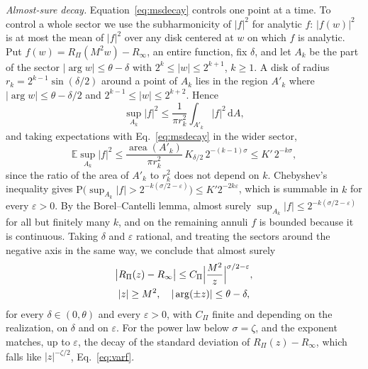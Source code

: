 \documentclass[aps,prd,10pt,twocolumn,superscriptaddress,nofootinbib,floatfix,longbibliography]{revtex4-2}
\newcommand{\bE}{\mathbb{E}}
\newcommand{\dd}{\mathrm{d}}
\begin{document}
\textit{Almost-sure decay.} Equation~\eqref{eq:msdecay} controls one point at a time. To control a whole sector we use the subharmonicity of $|f|^2$ for analytic $f$: $|f(w)|^2$ is at most the mean of $|f|^2$ over any disk centered at $w$ on which $f$ is analytic. Put $f(w)=R_\Pi(M^2w)-R_\infty$, an entire function, fix $\delta$, and let $A_k$ be the part of the sector $|\arg w|\le\theta-\delta$ with $2^k\le|w|\le2^{k+1}$, $k\ge1$. A disk of radius $r_k=2^{k-1}\sin(\delta/2)$ around a point of $A_k$ lies in the region $A'_k$ where $|\arg w|\le\theta-\delta/2$ and $2^{k-1}\le|w|\le2^{k+2}$. Hence
\[
\sup_{A_k}|f|^2\le\frac1{\pi r_k^2}\int_{A'_k}|f|^2\,\dd A ,
\]
and taking expectations with Eq.~\eqref{eq:msdecay} in the wider sector,
\[
\bE\sup_{A_k}|f|^2\le\frac{\operatorname{area}(A'_k)}{\pi r_k^2}\,K_{\delta/2}\,2^{-(k-1)\sigma}\le K'\,2^{-k\sigma},
\]
since the ratio of the area of $A'_k$ to $r_k^2$ does not depend on $k$. Chebyshev's inequality gives $\mathrm P\bigl(\sup_{A_k}|f|>2^{-k(\sigma/2-\varepsilon)}\bigr)\le K'2^{-2k\varepsilon}$, which is summable in $k$ for every $\varepsilon>0$. By the Borel--Cantelli lemma, almost surely $\sup_{A_k}|f|\le2^{-k(\sigma/2-\varepsilon)}$ for all but finitely many $k$, and on the remaining annuli $f$ is bounded because it is continuous. Taking $\delta$ and $\varepsilon$ rational, and treating the sectors around the negative axis in the same way, we conclude that almost surely
\begin{equation}
\label{eq:asdecay}
\begin{gathered}
\bigl|R_\Pi(z)-R_\infty\bigr|\le C_\Pi\Bigl|\frac{M^2}z\Bigr|^{\sigma/2-\varepsilon},\\
|z|\ge M^2,\quad|\arg(\pm z)|\le\theta-\delta ,
\end{gathered}
\end{equation}
for every $\delta\in(0,\theta)$ and every $\varepsilon>0$, with $C_\Pi$ finite and depending on the realization, on $\delta$ and on $\varepsilon$. For the power law below $\sigma=\zeta$, and the exponent matches, up to $\varepsilon$, the decay of the standard deviation of $R_\Pi(z)-R_\infty$, which falls like $|z|^{-\zeta/2}$, Eq.~\eqref{eq:varf}.
\end{document}
